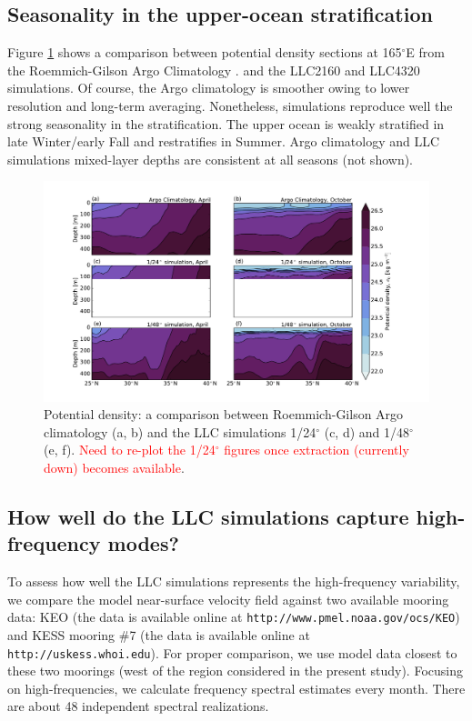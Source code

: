 \documentclass[grl]{agutex2015}
\begin{document}
\begin{article}
\subsection*{Seasonality in the upper-ocean stratification}

Figure \ref{figS2_1} shows a comparison between potential density sections
at 165$^\circ$E from
the Roemmich-Gilson Argo Climatology \citep[updated from][]{roemmich_gilson2009}.
and the LLC2160 and LLC4320 simulations. Of course, the Argo climatology is smoother
owing to lower resolution and long-term averaging. Nonetheless, simulations reproduce well the strong
seasonality in the stratification. The upper ocean is weakly stratified in late Winter/early Fall
and restratifies in Summer. Argo climatology and LLC simulations mixed-layer depths are consistent
at all seasons (not shown).

\begin{figure}[ht]
   \begin{center}
     \includegraphics[width=1.\textwidth]{figs/fig_s2_1.pdf}
  \caption{Potential density: a comparison between Roemmich-Gilson Argo
          climatology (a, b) and the LLC simulations 1/24$^\circ$ (c, d)
          and  1/48$^\circ$ (e, f). \textcolor{red}{Need to re-plot  the 1/24$^\circ$
          figures once extraction (currently down) becomes available}.}
  \label{figS2_1}
  \end{center}
\end{figure}

\subsection*{How well do the LLC simulations capture high-frequency modes?}
To assess how well the LLC simulations represents the high-frequency variability,
we compare the model near-surface velocity field against two available
mooring data: KEO (the data is available online at \texttt{http://www.pmel.noaa.gov/ocs/KEO})
and KESS mooring $\#$7 (the data is available online at \texttt{http://uskess.whoi.edu}).
For proper comparison, we use model data closest to these two moorings (west of
the region considered in the present study). Focusing on high-frequencies, we
calculate frequency spectral estimates every month. There are about 48 independent
spectral realizations.


\end{article}
\end{document}
